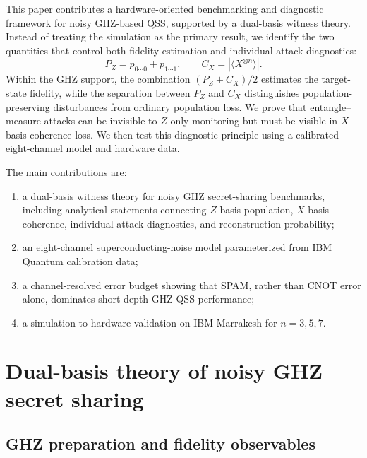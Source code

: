 \documentclass[aip,amsmath,amssymb,reprint,longbibliography]{revtex4-2}
\begin{document}
This paper contributes a hardware-oriented benchmarking and diagnostic framework for noisy GHZ-based QSS, supported by a dual-basis witness theory.  Instead of treating the simulation as the primary result, we identify the two quantities that control both fidelity estimation and individual-attack diagnostics:
\begin{equation}
P_Z=p_{0\cdots0}+p_{1\cdots1},\qquad C_X=|\langle X^{\otimes n}\rangle|.
\label{eq:pz_cx_intro}
\end{equation}
Within the GHZ support, the combination $(P_Z+C_X)/2$ estimates the target-state fidelity, while the separation between $P_Z$ and $C_X$ distinguishes population-preserving disturbances from ordinary population loss.  We prove that entangle--measure attacks can be invisible to $Z$-only monitoring but must be visible in $X$-basis coherence loss.  We then test this diagnostic principle using a calibrated eight-channel model and hardware data.

The main contributions are:
\begin{enumerate}[leftmargin=*]
\item a dual-basis witness theory for noisy GHZ secret-sharing benchmarks, including analytical statements connecting $Z$-basis population, $X$-basis coherence, individual-attack diagnostics, and reconstruction probability;
\item an eight-channel superconducting-noise model parameterized from IBM Quantum calibration data;
\item a channel-resolved error budget showing that SPAM, rather than CNOT error alone, dominates short-depth GHZ-QSS performance;
\item a simulation-to-hardware validation on IBM Marrakesh for $n=3,5,7$.
\end{enumerate}

\section{Dual-basis theory of noisy GHZ secret sharing}
\label{sec:theory}

\subsection{GHZ preparation and fidelity observables}
\label{subsec:ghzprep}
\end{document}
